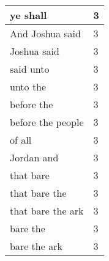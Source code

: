 \begin{center}
\begin{longtable}{|p{3.0in}|p{0.5in}|}
ye shall & 3\\ \hline 
And Joshua said & 3\\ \hline 
Joshua said & 3\\ \hline 
said unto & 3\\ \hline 
unto the & 3\\ \hline 
before the & 3\\ \hline 
before the people & 3\\ \hline 
of all & 3\\ \hline 
Jordan and & 3\\ \hline 
that bare & 3\\ \hline 
that bare the & 3\\ \hline 
that bare the ark & 3\\ \hline 
bare the & 3\\ \hline 
bare the ark & 3\\ \hline 
\end{longtable}
\end{center}





